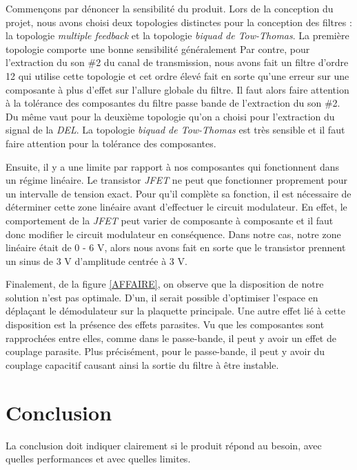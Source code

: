 \documentclass[11pt,letterpaper]{article}
\begin{document}
Commençons par dénoncer la sensibilité du produit. Lors de la conception du projet, nous avons choisi deux topologies distinctes pour la conception des filtres : la topologie \textit{multiple feedback} et la topologie \textit{biquad de Tow-Thomas}. La première topologie comporte une bonne sensibilité généralement Par contre, pour l'extraction du son \#2 du canal de transmission, nous avons fait un filtre d'ordre 12 qui utilise cette topologie et cet ordre élevé fait en sorte qu'une erreur sur une composante à plus d'effet sur l'allure globale du filtre. Il faut alors faire attention à la tolérance des composantes du filtre passe bande de l'extraction du son \#2. Du même vaut pour la deuxième topologie qu'on a choisi pour l'extraction du signal de la \textit{DEL}. La topologie \textit{biquad de Tow-Thomas} est très sensible et il faut faire attention pour la tolérance des composantes.

Ensuite, il y a une limite par rapport à nos composantes qui fonctionnent dans un régime linéaire. Le transistor \textit{JFET} ne peut que fonctionner proprement pour un intervalle de tension exact. Pour qu'il complète sa fonction, il est nécessaire de déterminer cette zone linéaire avant d'effectuer le circuit modulateur. En effet, le comportement de la \textit{JFET} peut varier de composante à composante et il faut donc modifier le circuit modulateur en conséquence. Dans notre cas, notre zone linéaire était de 0 - 6 V, alors nous avons fait en sorte que le transistor prennent un sinus de 3 V d'amplitude centrée à 3 V. 

Finalement, de la figure \ref{AFFAIRE}, on observe que la disposition de notre solution n'est pas optimale. D'un, il serait possible d'optimiser l'espace en déplaçant le démodulateur sur la plaquette principale. Une autre effet lié à cette disposition est la présence des effets parasites. Vu que les composantes sont rapprochées entre elles, comme dans le passe-bande, il peut y avoir un effet de couplage parasite. Plus précisément, pour le passe-bande, il peut y avoir du couplage capacitif causant ainsi la sortie du filtre à être instable.


\clearpage
\section{Conclusion}
La conclusion doit indiquer clairement si le produit répond au besoin, avec quelles performances et avec quelles limites.
\end{document}
